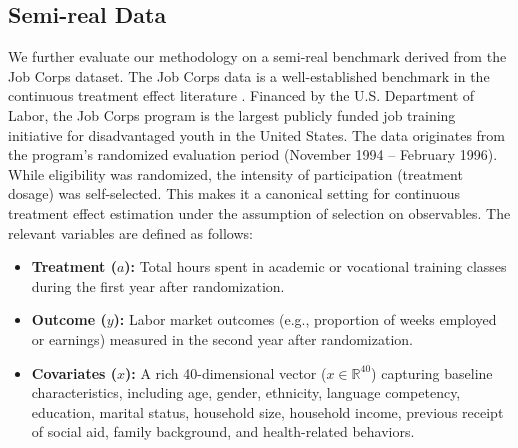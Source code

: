 \documentclass[english,11pt]{article}
\begin{document}
\subsection{Semi-real Data}
We further evaluate our methodology on a semi-real benchmark derived from the Job Corps dataset.
The Job Corps data is a well-established benchmark in the continuous treatment effect literature \citep{singh2024kernel,colangelo2025double}.
Financed by the U.S. Department of Labor, the Job Corps program is the largest publicly funded job training initiative for disadvantaged youth in the United States.
The data originates from the program's randomized evaluation period (November 1994 -- February 1996).
While eligibility was randomized, the intensity of participation (treatment dosage) was self-selected. This makes it a canonical setting for continuous treatment effect estimation under the assumption of selection on observables.
The relevant variables are defined as follows:
\begin{itemize}
    \item \textbf{Treatment ($a$):} Total hours spent in academic or vocational training classes during the first year after randomization.
    \item \textbf{Outcome ($y$):} Labor market outcomes (e.g., proportion of weeks employed or earnings) measured in the second year after randomization.
    \item \textbf{Covariates ($x$):} A rich 40-dimensional vector ($x \in \mathbb{R}^{40}$) capturing baseline characteristics, including age, gender, ethnicity, language competency, education, marital status, household size, household income, previous receipt of social aid, family background, and health-related behaviors.
\end{itemize}
\end{document}
